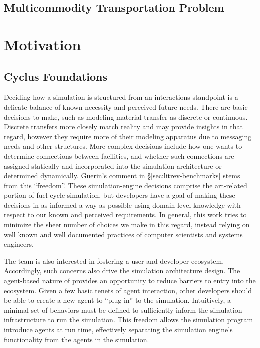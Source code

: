 \subsection{Multicommodity Transportation Problem}\label{intro:mtp}

\section{Motivation}

\subsection{Cyclus Foundations}\label{intro:cyc}

Deciding how a simulation is structured from an interactions standpoint is a
delicate balance of known necessity and perceived future needs. There are basic
decisions to make, such as modeling material transfer as discrete or
continuous. Discrete transfers more closely match reality and may provide
insights in that regard, however they require more of their modeling apparatus
due to messaging needs and other structures. More complex decisions include how
one wants to determine connections between facilities, and whether such
connections are assigned statically and incorporated into the simulation
architecture or determined dynamically. Guerin's comment
in \S\ref{sec:litrev-benchmarks} stems from this ``freedom''. These
simulation-engine decisions comprise the art-related portion of fuel cycle
simulation, but developers have a goal of making these decisions in as informed
a way as possible using domain-level knowledge with respect to our known and
perceived requirements. In general, this work tries to minimize the sheer number
of choices we make in this regard, instead relying on well known and well
documented practices of computer scientists and systems engineers.

The \Cyclus team is also interested in fostering a user and developer ecosystem.
Accordingly, such concerns also drive the simulation architecture design. The
agent-based nature of \Cyclus provides an opportunity to reduce barriers to
entry into the ecosystem. Given a few basic tenets of agent interaction, other
developers should be able to create a new agent to ``plug in'' to the
simulation. Intuitively, a minimal set of behaviors must be defined to
sufficiently inform the simulation infrastructure to run the simulation. This
freedom allows the simulation program introduce agents at run time, effectively
separating the simulation engine's functionality from the agents in the
simulation.

